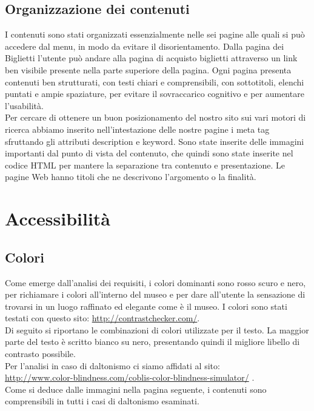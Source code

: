 \documentclass[10pt,a4paper,onecolumn]{article}
\begin{document}
\clearpage
\subsection{Organizzazione dei contenuti}
I contenuti sono stati organizzati essenzialmente nelle sei pagine alle quali si può accedere dal menu, in modo da evitare il disorientamento.
Dalla pagina dei Biglietti l'utente può andare alla pagina di acquisto biglietti attraverso un link ben visibile presente nella parte superiore della pagina.
Ogni pagina presenta contenuti ben strutturati, con testi chiari e comprensibili, con sottotitoli, elenchi puntati e ampie spaziature, per evitare il sovraccarico cognitivo e per aumentare l'usabilità.\\
Per cercare di ottenere un buon posizionamento del nostro sito sui vari motori di ricerca abbiamo inserito nell'intestazione delle nostre pagine i meta tag sfruttando gli attributi description e keyword.
Sono state inserite delle immagini importanti dal punto di vista del contenuto, che quindi sono state inserite nel codice HTML per mantere la separazione tra contenuto e presentazione.
Le pagine Web hanno titoli che ne descrivono l'argomento o la finalità.

\clearpage
\section{Accessibilità}
\subsection{Colori}
Come emerge dall'analisi dei requisiti, i colori dominanti sono rosso scuro e nero, per richiamare i colori all'interno del museo e per dare all'utente la sensazione di trovarsi in un luogo raffinato ed elegante come è il museo. I colori sono stati testati con questo sito: \url{http://contrastchecker.com/}.\\
Di seguito si riportano le combinazioni di colori utilizzate per il testo. La maggior parte del testo è scritto bianco su nero, presentando quindi il migliore libello di contrasto possibile.\\
Per l'analisi in caso di daltonismo ci siamo affidati al sito:\\ \url{http://www.color-blindness.com/coblis-color-blindness-simulator/} .\\
Come si deduce dalle immagini nella pagina seguente, i contenuti sono comprensibili in tutti i casi di daltonismo esaminati.
\end{document}
